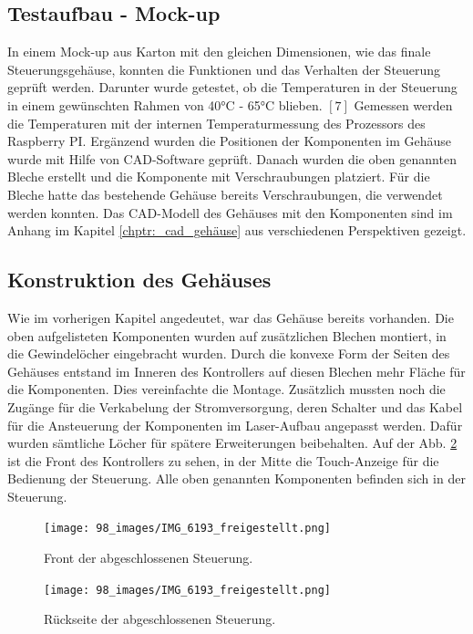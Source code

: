 \subsection{Testaufbau - Mock-up}
In einem Mock-up aus Karton mit den gleichen Dimensionen, wie das finale Steuerungsgehäuse, konnten die Funktionen und das Verhalten der Steuerung geprüft werden. Darunter wurde getestet, ob die Temperaturen in der Steuerung in einem gewünschten Rahmen von 40°C - 65°C blieben. $[7]$ Gemessen werden die Temperaturen mit der internen Temperaturmessung des Prozessors des Raspberry PI. Ergänzend wurden die Positionen der Komponenten im Gehäuse wurde mit Hilfe von CAD-Software geprüft. Danach wurden die oben genannten Bleche erstellt und die Komponente mit Verschraubungen platziert. Für die Bleche hatte das bestehende Gehäuse bereits Verschraubungen, die verwendet werden konnten. Das CAD-Modell des Gehäuses mit den Komponenten sind im Anhang im Kapitel \ref{chptr:_cad_gehäuse} aus verschiedenen Perspektiven gezeigt.

\subsection{Konstruktion des Gehäuses}
Wie im vorherigen Kapitel angedeutet, war das Gehäuse bereits vorhanden. Die oben aufgelisteten Komponenten wurden auf zusätzlichen Blechen montiert, in die Gewindelöcher eingebracht wurden. Durch die konvexe Form der Seiten des Gehäuses entstand im Inneren des Kontrollers auf diesen Blechen mehr Fläche für die Komponenten. Dies vereinfachte die Montage. Zusätzlich mussten noch die Zugänge für die Verkabelung der Stromversorgung, deren Schalter und das Kabel für die Ansteuerung der Komponenten im Laser-Aufbau angepasst werden. Dafür wurden sämtliche Löcher für spätere Erweiterungen beibehalten. Auf der Abb. \ref{fig:controller_free} ist die Front des Kontrollers zu sehen, in der Mitte die Touch-Anzeige für die Bedienung der Steuerung. Alle oben genannten Komponenten befinden sich in der Steuerung.

\begin{figure}[H]
    \centering
    \texttt{[image: 98\_images/IMG\_6193\_freigestellt.png]}
    \caption{Front der abgeschlossenen Steuerung.}
    \label{fig:controller_free}
\end{figure}

\begin{figure}[H]
    \centering
    \texttt{[image: 98\_images/IMG\_6193\_freigestellt.png]}
    \caption{Rückseite der abgeschlossenen Steuerung.}
    \label{fig:controller_free}
\end{figure}

\clearpage